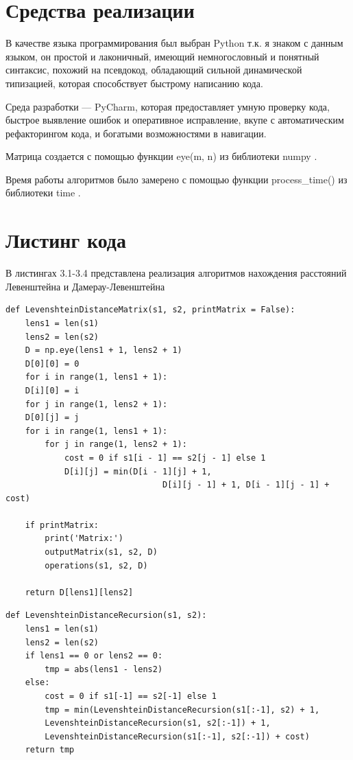 \documentclass[12pt]{report}
\begin{document}
\section{Средства реализации}
В качестве языка программирования был выбран Python т.к. я знаком с данным языком, он простой и лаконичный, имеющий немногословный и понятный синтаксис, похожий на псевдокод, обладающий сильной динамической типизацией, которая способствует быстрому написанию кода. 

Среда разработки — PyCharm, которая предоставляет умную проверку кода, быстрое выявление ошибок и оперативное исправление, вкупе с автоматическим рефакторингом кода, и богатыми возможностями в навигации.  

Матрица создается с помощью функции eye(m, n) из библиотеки numpy \cite{numpy}. 

Время  работы алгоритмов было замерено с помощью функции process\_time() из библиотеки time \cite{time}.

\newpage
\section{Листинг кода}

В листингах 3.1-3.4 представлена реализация алгоритмов нахождения расстояний Левенштейна и Дамерау-Левенштейна

\begin{lstlisting}[label=some-code,caption=Матричный алгоритм нахождения расстояния Левенштейна]
def LevenshteinDistanceMatrix(s1, s2, printMatrix = False):
	lens1 = len(s1)
	lens2 = len(s2)
	D = np.eye(lens1 + 1, lens2 + 1)
	D[0][0] = 0
	for i in range(1, lens1 + 1):
	D[i][0] = i
	for j in range(1, lens2 + 1):
	D[0][j] = j
	for i in range(1, lens1 + 1):
		for j in range(1, lens2 + 1):
			cost = 0 if s1[i - 1] == s2[j - 1] else 1
			D[i][j] = min(D[i - 1][j] + 1, 
								D[i][j - 1] + 1, D[i - 1][j - 1] + cost)

	if printMatrix:
		print('Matrix:')
		outputMatrix(s1, s2, D)
		operations(s1, s2, D)

	return D[lens1][lens2]
\end{lstlisting}

\begin{lstlisting}[label=some-code,caption=Рекурсивный алгоритм нахождения расстояния Левенштейна]
def LevenshteinDistanceRecursion(s1, s2):
	lens1 = len(s1)
	lens2 = len(s2)
	if lens1 == 0 or lens2 == 0:
		tmp = abs(lens1 - lens2)
	else:
		cost = 0 if s1[-1] == s2[-1] else 1
		tmp = min(LevenshteinDistanceRecursion(s1[:-1], s2) + 1,
		LevenshteinDistanceRecursion(s1, s2[:-1]) + 1,
		LevenshteinDistanceRecursion(s1[:-1], s2[:-1]) + cost)
	return tmp
\end{lstlisting}
\end{document}

